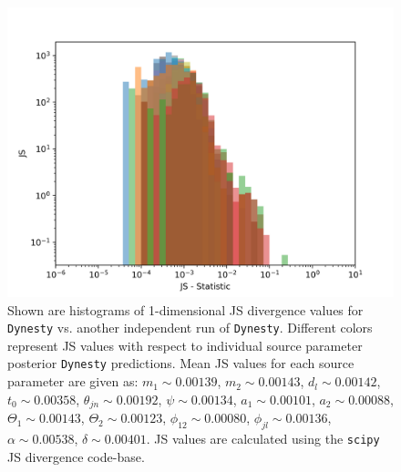 \begin{figure}
    \includegraphics[width=\columnwidth]{figures/dynesty-dynesty_indiJS.png}
    \caption[Dynesty vs. Dynesty full 1-D JS divergence histogram plot.]{\label{fig:dyn_vs_dyn_ful14D_JS} Shown are histograms of 1-dimensional JS divergence values for \texttt{Dynesty} vs. another independent run of \texttt{Dynesty}. Different colors represent JS values with respect to individual source parameter posterior \texttt{Dynesty} predictions. Mean JS values for each source parameter are given as: $m_1 \sim 0.00139$, $m_2 \sim 0.00143$, $d_l \sim 0.00142$, $t_0 \sim 0.00358$, $\theta_{jn} \sim 0.00192$, $\psi \sim 0.00134$, $a_1 \sim 0.00101$, $a_2 \sim 0.00088$, $\Theta_1 \sim 0.00143$, $\Theta_2 \sim 0.00123$, $\phi_{12} \sim 0.00080$, $\phi_{jl} \sim 0.00136$, $\alpha \sim 0.00538$, $\delta \sim 0.00401$. JS values are calculated using the \texttt{scipy} JS divergence code-base. }
\end{figure}
